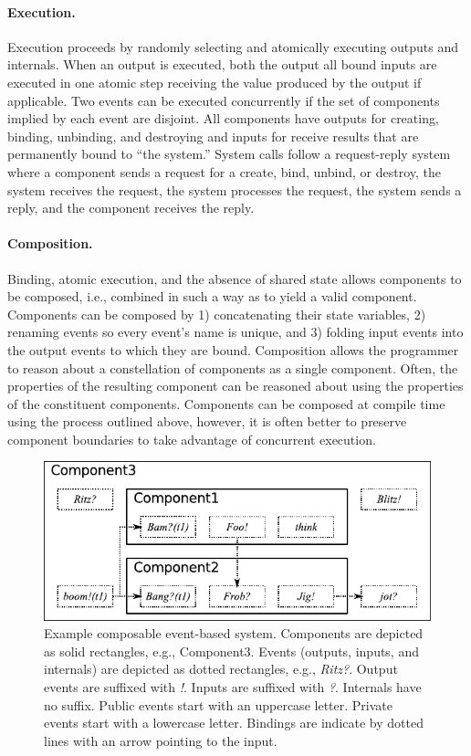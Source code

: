 \paragraph{Execution.}
Execution proceeds by randomly selecting and atomically executing outputs and internals.
When an output is executed, both the output all bound inputs are executed in one atomic step receiving the value produced by the output if applicable.
Two events can be executed concurrently if the set of components implied by each event are disjoint.
All components have outputs for creating, binding, unbinding, and destroying and inputs for receive results that are permanently bound to ``the system.''
System calls follow a request-reply system where a component sends a request for a create, bind, unbind, or destroy, the system receives the request, the system processes the request, the system sends a reply, and the component receives the reply.

\paragraph{Composition.}
Binding, atomic execution, and the absence of shared state allows components to be composed, i.e., combined in such a way as to yield a valid component.
Components can be composed by 1) concatenating their state variables, 2) renaming events so every event's name is unique, and 3) folding input events into the output events to which they are bound.
Composition allows the programmer to reason about a constellation of components as a single component.
Often, the properties of the resulting component can be reasoned about using the properties of the constituent components.
Components can be composed at compile time using the process outlined above, however, it is often better to preserve component boundaries to take advantage of concurrent execution.

\begin{figure}
\center
\includegraphics{system_model}
\caption{Example composable event-based system.
  Components are depicted as solid rectangles, e.g., Component3.
  Events (outputs, inputs, and internals) are depicted as dotted rectangles, e.g., \emph{Ritz?}.
  Output events are suffixed with \emph{!}.
  Inputs are suffixed with \emph{?}.
  Internals have no suffix.
  Public events start with an uppercase letter.
  Private events start with a lowercase letter.
  Bindings are indicate by dotted lines with an arrow pointing to the input.}
\label{sys_model}
\end{figure}

